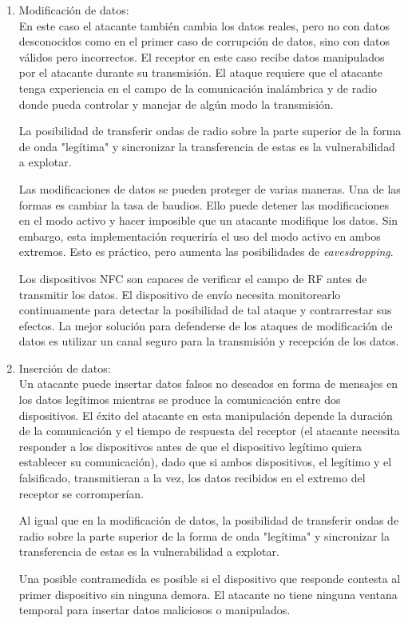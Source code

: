 \documentclass[12pt,a4paper,onecolumn,oneside]{report}
\begin{document}
\begin{enumerate}
\begin{enumerate}
\item Modificación de datos:\\
En este caso el atacante también cambia los datos reales, pero no con datos desconocidos como en el primer caso de corrupción de datos, sino con datos válidos pero incorrectos. El receptor en este caso recibe datos manipulados por el atacante durante su transmisión. El ataque requiere que el atacante tenga experiencia en el campo de la comunicación inalámbrica y de radio donde pueda controlar y manejar de algún modo la transmisión.

La posibilidad de transferir ondas de radio sobre la parte superior de la forma de onda "legítima" y sincronizar la transferencia de estas es la vulnerabilidad a explotar.

Las modificaciones de datos se pueden proteger de varias maneras. Una de las formas es cambiar la tasa de baudios. Ello puede detener las modificaciones en el modo activo y hacer imposible que un atacante modifique los datos. Sin embargo, esta implementación requeriría el uso del modo activo en ambos extremos. Esto es práctico, pero aumenta las posibilidades de \textit{eavesdropping}.

Los dispositivos NFC son capaces de verificar el campo de RF antes de transmitir los datos. El dispositivo de envío necesita monitorearlo continuamente para detectar la posibilidad de tal ataque y contrarrestar sus efectos. La mejor solución para defenderse de los ataques de modificación de datos es utilizar un canal seguro para la transmisión y recepción de los datos.

\item Inserción de datos:\\
Un atacante puede insertar datos falsos no deseados en forma de mensajes en los datos legítimos mientras se produce la comunicación entre dos dispositivos. El éxito del atacante en esta manipulación depende la duración de la comunicación y el tiempo de respuesta del receptor (el atacante necesita responder a los dispositivos antes de que el dispositivo legítimo quiera establecer su comunicación), dado que si ambos dispositivos, el legítimo y el falsificado, transmitieran a la vez, los datos recibidos en el extremo del receptor se corromperían. 

Al igual que en la modificación de datos, la posibilidad de transferir ondas de radio sobre la parte superior de la forma de onda "legítima" y sincronizar la transferencia de estas es la vulnerabilidad a explotar.

Una posible contramedida es posible si el dispositivo que responde contesta al primer dispositivo sin ninguna demora. El atacante no tiene ninguna ventana temporal para insertar datos maliciosos o manipulados. 


\end{enumerate}
\end{enumerate}
\end{document}
